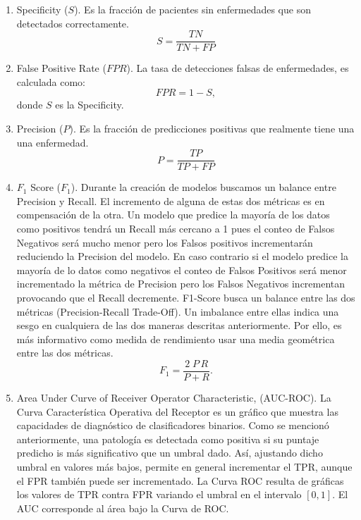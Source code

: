 {\begin{enumerate}
    \item Specificity ($S$). Es la fracción de pacientes sin enfermedades que son detectados
          correctamente.
    \begin{equation}
        \label{eq:Specificity}
        S = \frac{TN}{TN + FP}
    \end{equation}

    \item False Positive Rate ($FPR$). La tasa de detecciones falsas de enfermedades, es calculada
          como:
    \begin{equation}
        \label{eq:FPR}
        FPR = 1 - S,
    \end{equation}
    donde $S$ es la Specificity.

    \item Precision ($P$). Es la fracción de predicciones positivas que realmente tiene una una
          enfermedad.
    \begin{equation}
        \label{eq:P}
        P = \frac{TP}{TP + FP}
    \end{equation}

    \item $F_1$ Score ($F_1$).  Durante la creación de modelos buscamos un balance entre Precision y
          Recall. El incremento
          de alguna de estas dos métricas es en compensación de la otra. Un modelo que predice la
          mayoría de los datos como positivos tendrá un Recall más cercano a 1 pues el conteo de
          Falsos Negativos será mucho menor pero los Falsos positivos incrementarán reduciendo la
          Precision del modelo. En caso contrario si el modelo predice la mayoría de lo datos como
          negativos el conteo de Falsos Positivos será menor incrementado la métrica de Precision
          pero los Falsos Negativos incrementan provocando que el Recall decremente. F1-Score
          busca un balance entre las dos métricas (Precision-Recall Trade-Off). Un imbalance
          entre ellas indica una sesgo en cualquiera de las dos maneras descritas anteriormente.
          Por ello, es más informativo como medida de rendimiento usar una media geométrica entre
          las dos métricas.
    \begin{equation}
        \label{eq:f1}
        F_1 = \frac{2\; P \, R}{P + R}.
    \end{equation}

    \item  Area Under Curve of Receiver Operator Characteristic, (AUC-ROC). La Curva Característica
    Operativa del Receptor es un gráfico que muestra las capacidades de diagnóstico de clasificadores
    binarios. Como se mencionó anteriormente, una patología es detectada como positiva si su puntaje
    predicho is más significativo que un umbral dado. Así, ajustando dicho umbral en valores más
    bajos, permite en general incrementar el TPR, aunque el FPR también puede ser incrementado.
    La Curva ROC resulta de gráficas los valores de TPR contra FPR variando el umbral en el intervalo
    $[0,1]$. El AUC corresponde al área bajo la Curva de ROC.


\end{enumerate}}
